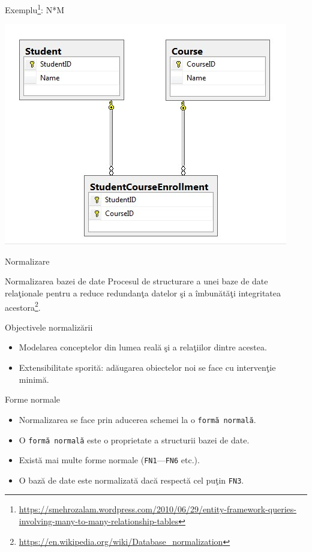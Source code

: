 \documentclass[presentation]{beamer}
\begin{document}
\begin{frame}[label={sec:orgcb471b1}]{Exemplu\footnote{\url{https://smehrozalam.wordpress.com/2010/06/29/entity-framework-queries-involving-many-to-many-relationship-tables}}: N*M}
\begin{center}
\includegraphics[width=.8\textwidth]{img/many-to-many.png}
\end{center}
\end{frame}
\begin{frame}[label={sec:orgd5a24d7}]{Normalizare}
\begin{block}{Normalizarea bazei de date}
\vskip 0.1in
Procesul de structurare a unei baze de date relaţionale pentru a reduce redundanţa datelor şi a îmbunătăţi integritatea acestora\footnote{\url{https://en.wikipedia.org/wiki/Database\_normalization}}.
\end{block}
\end{frame}
\begin{frame}[label={sec:org3faea94}]{Objectivele normalizării}
\begin{itemize}
\item Modelarea conceptelor din lumea reală şi a relaţiilor dintre acestea.
\item Extensibilitate sporită: adăugarea obiectelor noi se face cu intervenţie minimă.
\end{itemize}
\end{frame}
\begin{frame}[label={sec:org261f74e},fragile]{Forme normale}
 \begin{itemize}
\item Normalizarea se face prin aducerea schemei la o \texttt{formă normală}.
\item O \texttt{formă normală} este o proprietate a structurii bazei de date.
\item Există mai multe forme normale (\texttt{FN1}---\texttt{FN6} etc.).
\item O bază de date este normalizată dacă respectă cel puţin \texttt{FN3}.
\end{itemize}
\end{frame}
\end{document}
